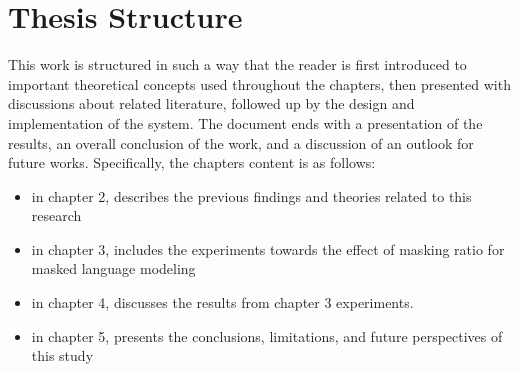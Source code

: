 
\section{Thesis Structure}


This work is structured in such a way that the reader is first introduced to important theoretical concepts used throughout the chapters, then presented with discussions about related literature, followed up by the design and implementation of the system. The document ends with a presentation of the results, an overall conclusion of the work, and a discussion of an outlook for future works. Specifically, the chapters content is as follows:

\begin{itemize}
    \item in chapter 2, describes the previous findings and theories related to this research
    \item in chapter 3, includes the experiments towards the effect of masking ratio for masked language modeling
    \item in chapter 4, discusses the results from chapter 3 experiments.
    \item in chapter 5, presents the conclusions, limitations, and future perspectives of this study
\end{itemize}
